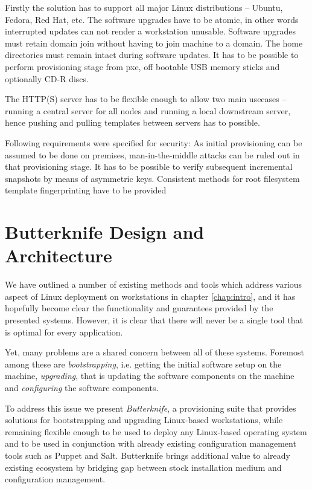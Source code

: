 \documentclass[a4paper,11pt]{kth-mag}
\begin{document}
Firstly the solution has to support all major Linux distributions
-- Ubuntu, Fedora, Red Hat, etc.
The software upgrades have to be atomic, in other words
interrupted updates can not render a workstation unusable.
Software upgrades must retain domain join without having
to join machine to a domain.
The home directories must remain intact during software updates.
It has to be possible to perform provisioning stage
from \acrfull{pxe},
off bootable USB memory sticks and optionally CD-R discs.

The HTTP(S) server has to be flexible enough to allow two main usecases --
running a central server for all nodes and
running a local downstream server, hence
pushing and pulling templates between servers has to possible.

Following requirements were specified for security:
As initial provisioning can be assumed to be done on premises,
man-in-the-middle attacks can be ruled out in that
provisioning stage.
It has to be possible to verify subsequent incremental snapshots by means of asymmetric keys.
Consistent methods for root filesystem template fingerprinting have to be provided

%
%
%
%
\chapter{Butterknife Design and Architecture}
\label{chap:design}
We have outlined a number of existing methods and tools
which address various aspect of Linux deployment on workstations
in chapter \ref{chap:intro}, and it has hopefully become clear
the functionality and guarantees provided by the presented systems.
However, it is clear that there will never be a single tool
that is optimal for every application.

Yet, many problems are a shared concern between all of these systems.
Foremost among these are \emph{bootstrapping}, i.e. getting
the initial software setup on the machine,
\emph{upgrading}, that is updating the software components on the machine and
\emph{configuring} the software components.

To address this issue we present \emph{Butterknife},
a provisioning suite that provides solutions for bootstrapping and
upgrading Linux-based workstations, while remaining flexible enough
to be used to deploy any Linux-based operating system
and to be used in conjunction with already existing
configuration management tools such as Puppet and Salt.
Butterknife brings additional value to already existing
ecosystem by bridging gap between
stock installation medium and
configuration management.
\end{document}
